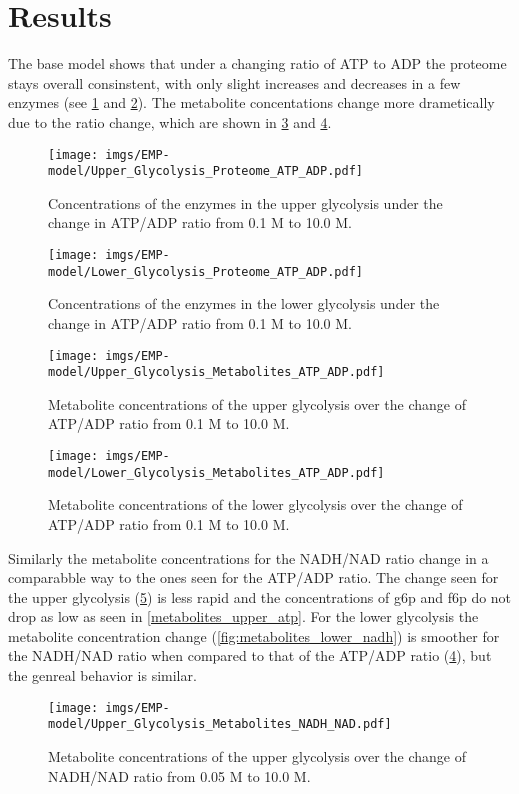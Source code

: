 \section{Results}
The base model shows that under a changing ratio of ATP to ADP the proteome stays overall consinstent, with only slight increases and decreases in a few enzymes (see \ref{fig:proteome_upper_atp} and \ref{fig:proteome_lower_atp}). The metabolite concentations change more drametically due to the ratio change, which are shown in \ref{fig:metabolites_upper_atp} and \ref{fig:metabolites_lower_atp}. 
\begin{figure}[H]
    \centering
    \texttt{[image: imgs/EMP-model/Upper\_Glycolysis\_Proteome\_ATP\_ADP.pdf]}
    \caption{Concentrations of the enzymes in the upper glycolysis under the change in ATP/ADP ratio from 0.1 M to 10.0 M.}
    \label{fig:proteome_upper_atp}
\end{figure}

\begin{figure}[H]
    \centering
    \texttt{[image: imgs/EMP-model/Lower\_Glycolysis\_Proteome\_ATP\_ADP.pdf]}
    \caption{Concentrations of the enzymes in the lower glycolysis under the change in ATP/ADP ratio from 0.1 M to 10.0 M.}
    \label{fig:proteome_lower_atp}
\end{figure}

\begin{figure}[H]
    \centering
    \texttt{[image: imgs/EMP-model/Upper\_Glycolysis\_Metabolites\_ATP\_ADP.pdf]}
    \caption{Metabolite concentrations of the upper glycolysis over the change of ATP/ADP ratio from 0.1 M to 10.0 M.}
    \label{fig:metabolites_upper_atp}
\end{figure}

\begin{figure}[H]
    \centering
    \texttt{[image: imgs/EMP-model/Lower\_Glycolysis\_Metabolites\_ATP\_ADP.pdf]}
    \caption{Metabolite concentrations of the lower glycolysis over the change of ATP/ADP ratio from 0.1 M to 10.0 M.}
    \label{fig:metabolites_lower_atp}
\end{figure}

Similarly the metabolite concentrations for the NADH/NAD ratio change in a comparabble way to the ones seen for the ATP/ADP ratio. The change seen for the upper glycolysis (\ref{fig:metabolites_upper_nadh}) is less rapid and the concentrations of g6p and f6p do not drop as low as seen in \ref{metabolites_upper_atp}. For the lower glycolysis the metabolite concentration change (\ref{fig:metabolites_lower_nadh}) is smoother for the NADH/NAD ratio when compared to that of the ATP/ADP ratio (\ref{fig:metabolites_lower_atp}), but the genreal behavior is similar.
\begin{figure}[H]
    \centering
    \texttt{[image: imgs/EMP-model/Upper\_Glycolysis\_Metabolites\_NADH\_NAD.pdf]}
    \caption{Metabolite concentrations of the upper glycolysis over the change of NADH/NAD ratio from 0.05 M to 10.0 M.}
    \label{fig:metabolites_upper_nadh}
\end{figure}

